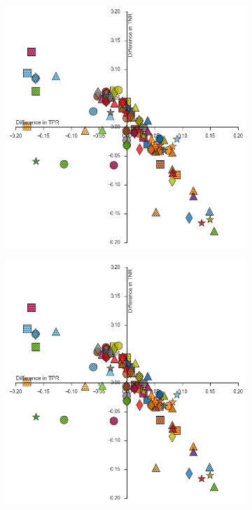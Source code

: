 \documentclass{sig-alternate-05-2015}
\begin{document}
	\begin{figure}
		\centering
		\vspace*{-1.5cm}\hspace*{-1.9cm}\begin{subfigure}{.5\textwidth}
			\includegraphics[scale=0.61]{classifier_dataset_plt_2016-10-26_11-46-14}
			\label{fig:res}
		\end{subfigure}\hspace*{4cm}\vspace*{-0.5cm}%
		\hspace*{-2cm}\begin{subfigure}{.5\textwidth}
			\includegraphics[scale=0.61]{classifier_dataset_plt_2016-10-26_11-46-14}

\end{subfigure}
\end{figure}
\end{document}
